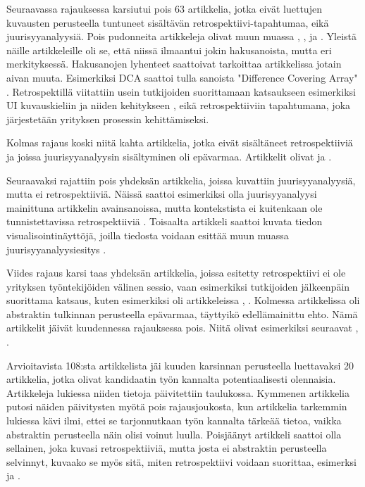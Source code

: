 Seuraavassa rajauksessa karsiutui pois 63 artikkelia, jotka eivät luettujen kuvausten perusteella tuntuneet sisältävän retrospektiivi-tapahtumaa, eikä juurisyyanalyysiä. Pois pudonneita artikkeleja olivat muun muassa \citep{yang2012personalized}, \citep{ji2010constructions}, \citep{helms2008retrospective} ja \citep{richardson2006developing}. Yleistä näille artikkeleille oli se, että niissä ilmaantui jokin hakusanoista, mutta eri merkityksessä. Hakusanojen lyhenteet saattoivat tarkoittaa artikkelissa jotain aivan muuta. Esimerkiksi DCA saattoi tulla sanoista "Difference Covering Array" \citep{ji2010constructions}. Retrospektillä viitattiin usein tutkijoiden suorittamaan katsaukseen esimerkiksi UI kuvauskieliin ja niiden kehitykseen \citep{helms2008retrospective}, eikä retrospektiiviin tapahtumana, joka järjestetään yrityksen prosessin kehittämiseksi.

Kolmas rajaus koski niitä kahta artikkelia, jotka eivät sisältäneet retrospektiiviä ja joissa juurisyyanalyysin sisältyminen oli epävarmaa. Artikkelit olivat \citep{anquetil2007software} ja \citep{wang2004strider}.

Seuraavaksi rajattiin pois yhdeksän artikkelia, joissa kuvattiin juurisyyanalyysiä, mutta ei retrospektiiviä. Näissä saattoi esimerkiksi olla juurisyyanalyysi mainittuna artikkelin avainsanoissa, mutta kontekstista ei kuitenkaan ole tunnistettavissa retrospektiiviä \citep{yu1998software}. Toisaalta artikkeli saattoi kuvata tiedon visualisointinäyttöjä, joilla tiedosta voidaan esittää muun muassa juurisyyanalyysiesitys \citep{hao2008density}.

Viides rajaus karsi taas yhdeksän artikkelia, joissa esitetty retrospektiivi ei ole yrityksen työntekijöiden välinen sessio, vaan esimerkiksi tutkijoiden jälkeenpäin suorittama katsaus, kuten esimerkiksi oli artikkeleissa \citep{wolforth2010generalizable}, \citep{ardimento2004multiview}. Kolmessa artikkelissa oli abstraktin tulkinnan perusteella epävarmaa, täyttyikö edellämainittu ehto. Nämä artikkelit jäivät kuudennessa rajauksessa pois. Niitä olivat esimerkiksi seuraavat \citep{xu2012enabling}, \citep{grady1996software}. 

Arvioitavista 108:sta artikkelista jäi kuuden karsinnan perusteella luettavaksi 20 artikkelia, jotka olivat kandidaatin työn kannalta potentiaalisesti olennaisia. Artikkeleja lukiessa niiden tietoja päivitettiin taulukossa. Kymmenen artikkelia putosi näiden päivitysten myötä pois rajausjoukosta, kun artikkelia tarkemmin lukiessa kävi ilmi, ettei se tarjonnutkaan työn kannalta tärkeää tietoa, vaikka abstraktin perusteella näin olisi voinut luulla. Poisjäänyt artikkeli saattoi olla sellainen, joka kuvasi retrospektiiviä, mutta josta ei abstraktin perusteella selvinnyt, kuvaako se myös sitä, miten retrospektiivi voidaan suorittaa, esimerksi \citep{glass2002loyal} ja \citep{drury2012obstacles}.

